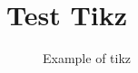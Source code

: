 \chapter{Test Tikz}

\begin{figure}[h]
  \centering
  \caption{Example of tikz}
  \label{fig:label}
\end{figure}
